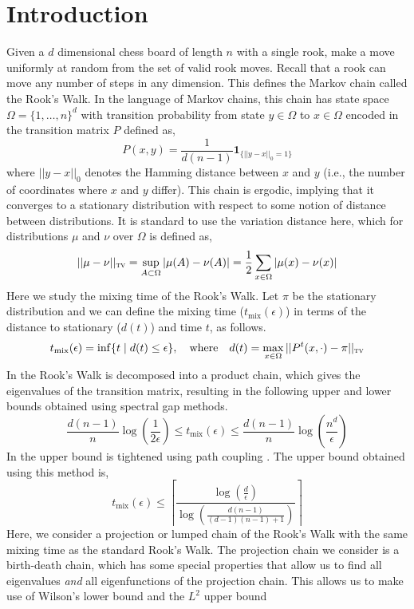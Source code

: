 \documentclass{article}
\theoremstyle{definition}
\theoremstyle{definition}
\theoremstyle{definition}
\theoremstyle{definition}
\theoremstyle{named}
\begin{document}
   \section{Introduction}
   Given a $d$ dimensional chess board of length $n$ with a single rook, make a move uniformly at random from the set of valid rook moves. Recall that a rook can move any number of steps in any dimension. This defines the Markov chain called the Rook's Walk. In the language of Markov chains, this chain has state space $\Omega=\{1,\dots,n\}^d$ with transition probability from state $y\in \Omega$ to $x\in \Omega$ encoded in the transition matrix $P$ defined as,
   \[P(x,y) = \frac{1}{d(n-1)}\mathbf{1}_{\{||y-x||_0=1\}}\]
   where $||y-x||_0$ denotes the Hamming distance between $x$ and $y$ (i.e., the number of coordinates where $x$ and $y$ differ). This chain is ergodic, implying that it converges to a stationary distribution with respect to some notion of distance between distributions. It is standard to use the variation distance here, which for distributions $\mu$ and $\nu$ over $\Omega$ is defined as,
      \[||\mu-\nu||_\textsc{tv} = \sup_{A\subset \Omega} |\mu(A) - \nu(A)| = \frac{1}{2}\sum_{x\in \Omega}|\mu(x) - \nu(x)|\] 
   Here we study the mixing time of the Rook's Walk. Let $\pi$ be the stationary distribution and we can define the mixing time ($t_\text{mix}(\epsilon)$) in terms of the distance to stationary ($d(t)$) and time $t$, as follows.
      \[t_\text{mix}(\epsilon) = \inf \{t \mid d(t)\leq \epsilon\}, \quad \text{where} \quad d(t) =\max_{x\in \Omega}||P^t(x,\cdot) - \pi||_\textsc{tv}\]
   In \cite{steven_s._kim_mixing_2012} the Rook's Walk is decomposed into a product chain, which gives the eigenvalues of the transition matrix, resulting in the following upper and lower bounds obtained using spectral gap methods.
   \[\frac{d(n-1)}{n}\log\left(\frac{1}{2\epsilon}\right) \leq t_\text{mix}(\epsilon) \leq \frac{d(n-1)}{n}\log\left(\frac{n^d}{\epsilon}\right)\]
   In \cite{mcleman_mixing_2017} the upper bound is tightened using path coupling \cite{646111}. The upper bound obtained using this method is,
   \[t_\text{mix}(\epsilon) \leq \left\lceil\frac{\log\left(\frac{d}{\epsilon}\right)}{\log\left(\frac{d(n-1)}{(d-1)(n-1)+1}\right)}\right\rceil\]
   Here, we consider a projection or lumped chain of the Rook's Walk with the same mixing time as the standard Rook's Walk. The projection chain we consider is a birth-death chain, which has some special properties that allow us to find all eigenvalues \emph{and} all eigenfunctions of the projection chain. This allows us to make use of Wilson's lower bound \cite{Wilson_2004} and the $L^2$ upper bound \cite{diaconis_group_1988,diaconis_generating_1981,levin_markov_2017}
\end{document}
